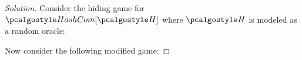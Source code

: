\begin{proof}[Solution]
Consider the hiding game for $\algo{HashCom}[\algo{H}]$ where $\algo{H}$ is modeled as a random oracle:

\begin{figure}[h]
  \begin{center}
    \begin{tcolorbox}[width=8cm]
      \begin{pchstack}
        \pchspace
      \end{pchstack}
    \end{tcolorbox}
  \end{center}
\end{figure}

Now consider the following modified game:


\end{proof}
